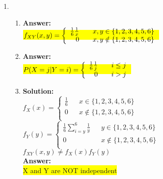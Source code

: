 \documentclass{article}
\newcommand{\myansw}{\textbf{Answer:}\\}
\newcommand{\mysolu}{\textbf{Solution:}\\}
\begin{document}
\begin{enumerate}
\begin{enumerate}
	\end{enumerate}
	\item
	\begin{enumerate}
		\item
		\myansw
		\colorbox{yellow}{${\mathlarger{f_{XY}(x,y) = \left\lbrace \begin{array}{rcl}\frac{1}{6} \frac{1}{x} & & x, y  \in \{1,2,3,4,5,6\}\\
					0 & & x,y \notin \{1,2,3,4,5,6\}\\
					\end{array}\right.}}$}\\
		\item
		\myansw
		\colorbox{yellow}{${\mathlarger{P(X = j|Y = i) = \left\lbrace \begin{array}{rcl}\frac{1}{6} \frac{1}{j} & & i \leq j\\
					0 & & i > j\\
					\end{array}\right.}}$}\\
		\item
		\mysolu
		${f_X(x) = \left\lbrace \begin{array}{rcl}\frac{1}{6} & & x \in \{1,2,3,4,5,6\}\\
			0 & & x\notin \{1,2,3,4,5,6\}\\
			\end{array}\right.}$\\
		${f_Y(y) = \left\lbrace \begin{array}{rcl}\frac{1}{6}\sum\limits_{i = y}^6 \frac{1}{y} & & y \in \{1,2,3,4,5,6\}\\
			0 & & x\notin \{1,2,3,4,5,6\}\\
			\end{array}\right.}$\\
		${f_{XY}(x,y) \neq f_X(x)f_Y(y)}$\\
		\myansw
		\colorbox{yellow}{X and Y are NOT independent}\\	
		

\end{enumerate}
\end{enumerate}
\end{document}
